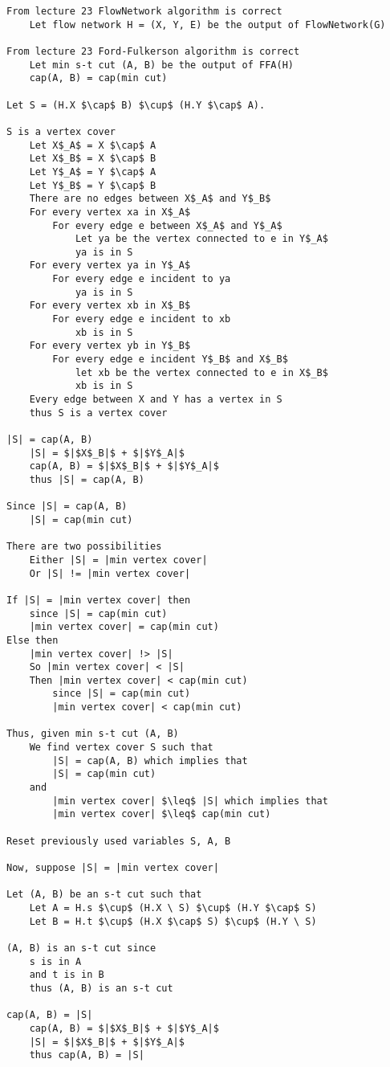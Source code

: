 \documentclass[11pt]{article}
\begin{document}
\begin{lstlisting}[basicstyle=\small, mathescape=true]
From lecture 23 FlowNetwork algorithm is correct
	Let flow network H = (X, Y, E) be the output of FlowNetwork(G) 
	
From lecture 23 Ford-Fulkerson algorithm is correct
	Let min s-t cut (A, B) be the output of FFA(H)
	cap(A, B) = cap(min cut)	

Let S = (H.X $\cap$ B) $\cup$ (H.Y $\cap$ A).

S is a vertex cover	
	Let X$_A$ = X $\cap$ A
	Let X$_B$ = X $\cap$ B
	Let Y$_A$ = Y $\cap$ A
	Let Y$_B$ = Y $\cap$ B
	There are no edges between X$_A$ and Y$_B$
	For every vertex xa in X$_A$
		For every edge e between X$_A$ and Y$_A$
			Let ya be the vertex connected to e in Y$_A$
			ya is in S
	For every vertex ya in Y$_A$
		For every edge e incident to ya
			ya is in S
	For every vertex xb in X$_B$
		For every edge e incident to xb
			xb is in S
	For every vertex yb in Y$_B$
		For every edge e incident Y$_B$ and X$_B$
			let xb be the vertex connected to e in X$_B$
			xb is in S
	Every edge between X and Y has a vertex in S
	thus S is a vertex cover

|S| = cap(A, B)
	|S| = $|$X$_B|$ + $|$Y$_A|$
	cap(A, B) = $|$X$_B|$ + $|$Y$_A|$
	thus |S| = cap(A, B)

Since |S| = cap(A, B)
	|S| = cap(min cut)

There are two possibilities
	Either |S| = |min vertex cover|
	Or |S| != |min vertex cover|
	
If |S| = |min vertex cover| then
	since |S| = cap(min cut)
	|min vertex cover| = cap(min cut)
Else then
	|min vertex cover| !> |S|
	So |min vertex cover| < |S|
	Then |min vertex cover| < cap(min cut)
		since |S| = cap(min cut)
		|min vertex cover| < cap(min cut)

Thus, given min s-t cut (A, B)
	We find vertex cover S such that
		|S| = cap(A, B) which implies that
		|S| = cap(min cut)
	and
		|min vertex cover| $\leq$ |S| which implies that
		|min vertex cover| $\leq$ cap(min cut)
	
Reset previously used variables S, A, B

Now, suppose |S| = |min vertex cover|

Let (A, B) be an s-t cut such that
	Let A = H.s $\cup$ (H.X \ S) $\cup$ (H.Y $\cap$ S)
	Let B = H.t $\cup$ (H.X $\cap$ S) $\cup$ (H.Y \ S)
		
(A, B) is an s-t cut since
	s is in A
	and t is in B
	thus (A, B) is an s-t cut
		
cap(A, B) = |S|
	cap(A, B) = $|$X$_B|$ + $|$Y$_A|$
	|S| = $|$X$_B|$ + $|$Y$_A|$
	thus cap(A, B) = |S|
		

\end{lstlisting}
\end{document}
